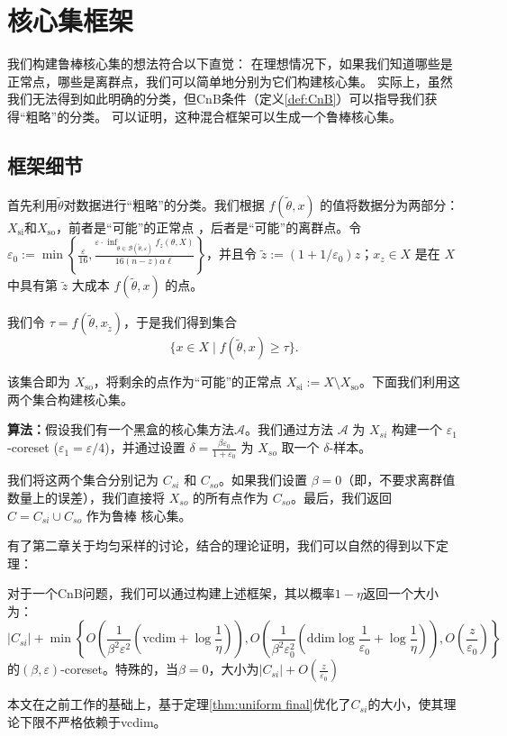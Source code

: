 \chapter{核心集框架}

我们构建鲁棒核心集的想法符合以下直觉：
在理想情况下，如果我们知道哪些是正常点，哪些是离群点，我们可以简单地分别为它们构建核心集。
实际上，虽然我们无法得到如此明确的分类，但CnB条件（定义\ref{def:CnB}）可以指导我们获得“粗略”的分类。
可以证明\cite{Wang2021RobustAF}，这种混合框架可以生成一个鲁棒核心集。

\section{框架细节}

首先利用$\tilde{\theta}$对数据进行“粗略”的分类。我们根据 $f(\tilde{\theta}, x)$ 的值将数据分为两部分：$X_{\text{si}}$和$X_{\text{so}}$，前者是“可能”的正常点
，后者是“可能”的离群点。令 $\varepsilon_0 := \min \left\{ \frac{\varepsilon}{16}, \frac{\varepsilon \cdot \inf_{\theta \in \mathcal{B}(\tilde{\theta}, \varepsilon)} f_z(\theta, X)}{16(n - z) \alpha \ell} \right\}$，并且令 $\tilde{z} := (1 + 1/\varepsilon_0) z$；$x_z \in X$ 是在 $X$ 中具有第 $\tilde{z}$ 大成本 $f(\tilde{\theta}, x)$ 的点。

我们令 $\tau = f(\tilde{\theta}, x_{\tilde{z}})$，于是我们得到集合
\begin{equation}
\{ x \in X \mid f(\tilde{\theta}, x) \geq \tau \}.
\end{equation}

该集合即为 $X_{\text{so}}$，将剩余的点作为“可能”的正常点 $X_{\text{si}} := X \setminus X_{\text{so}}$。下面我们利用这两个集合构建核心集。

\textbf{算法：}假设我们有一个黑盒的核心集方法$\mathcal{A}$。我们通过方法 $\mathcal{A}$ 为 $X_{si}$ 构建一个 $\varepsilon_1$-coreset ($\varepsilon_1 = \varepsilon / 4$)，并通过设置 $\delta = \frac{\beta \varepsilon_0}{1 + \varepsilon_0}$ 为 $X_{so}$ 取一个 $\delta$-样本。

我们将这两个集合分别记为 $C_{si}$ 和 $C_{so}$。如果我们设置 $\beta = 0$（即，不要求离群值数量上的误差），我们直接将 $X_{so}$ 的所有点作为 $C_{so}$。最后，我们返回 $C = C_{si} \cup C_{so}$ 作为鲁棒 核心集。

有了第二章关于均匀采样的讨论，结合\cite{Wang2021RobustAF}的理论证明，我们可以自然的得到以下定理：
\begin{theorem}
    对于一个CnB问题，我们可以通过构建上述框架，其以概率$1-\eta$返回一个大小为：
    \begin{equation*}
        |C_{si}|+\min\left\{O\left(\frac{1}{\beta^2\varepsilon^2}(\text{vcdim}+\log \frac 1 \eta)\right),O\left(\frac{1}{\beta^2\varepsilon_0^2}(\text{ddim}\log\frac{1}{\varepsilon_0}+\log \frac{1}{\eta})\right),O\left(\frac z {\varepsilon_0}\right)\right\}
    \end{equation*}
的$(\beta,\varepsilon)$-coreset。特殊的，当$\beta = 0$，大小为$|C_{si}|+O\left(\frac{z}{\varepsilon_0}\right)$
\end{theorem}
本文在之前工作的基础上，基于定理\ref{thm:uniform final}优化了$C_{si}$的大小，使其理论下限不严格依赖于vcdim。

